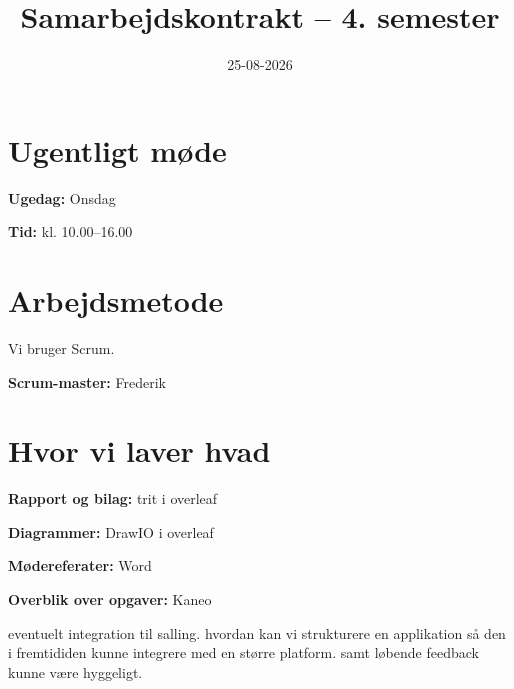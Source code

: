 \documentclass[a4paper,12pt]{article}
\title{Samarbejdskontrakt -- 4. semester}
\date{25-08-2026}
\begin{document}
\maketitle

\section{Ugentligt møde}

\textbf{Ugedag:} Onsdag

\textbf{Tid:} kl. 10.00--16.00

\section{Arbejdsmetode}

Vi bruger Scrum.

\textbf{Scrum-master:} Frederik

\section{Hvor vi laver hvad}

\textbf{Rapport og bilag:} trit i overleaf

\textbf{Diagrammer:} DrawIO i overleaf

\textbf{Mødereferater:} Word

\textbf{Overblik over opgaver:} Kaneo


eventuelt integration til salling. hvordan kan vi strukturere en applikation så den i fremtididen kunne integrere med en større platform. samt løbende feedback kunne være hyggeligt.
\end{document}
